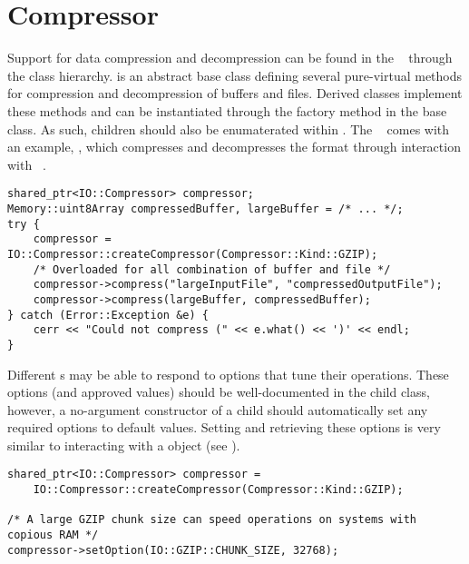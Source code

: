 \section{Compressor}
\label{sec-compressor}

Support for data compression and decompression can be found in the
\lname~ through the  class hierarchy.   is
an abstract base class defining several pure-virtual methods for compression
and decompression of buffers and files.  Derived classes implement these methods
and can be instantiated through the factory method in the base class.
As such, children should also be enumaterated within . 
The \lname~ comes with an example, , which compresses and
decompresses the  format through interaction with
~\cite{zlib}.

\begin{lstlisting}[caption={Using a \class{Compressor} Object}, label=lst:compressoruse]
shared_ptr<IO::Compressor> compressor;
Memory::uint8Array compressedBuffer, largeBuffer = /* ... */;
try {
	compressor = IO::Compressor::createCompressor(Compressor::Kind::GZIP);
	/* Overloaded for all combination of buffer and file */
	compressor->compress("largeInputFile", "compressedOutputFile");
	compressor->compress(largeBuffer, compressedBuffer);
} catch (Error::Exception &e) {
	cerr << "Could not compress (" << e.what() << ')' << endl;
}
\end{lstlisting}

Different s may be able to respond to options that tune their
operations.  These options (and approved values) should be well-documented
in the child class, however, a no-argument constructor of a child
 should automatically set any required options to default
values.  Setting and retrieving these options is very similar to interacting
with a  object (see ).

\begin{lstlisting}[caption={Setting \class{Compressor} Options}, label=lst:compressoroptions]
shared_ptr<IO::Compressor> compressor =
    IO::Compressor::createCompressor(Compressor::Kind::GZIP);

/* A large GZIP chunk size can speed operations on systems with copious RAM */
compressor->setOption(IO::GZIP::CHUNK_SIZE, 32768);

\end{lstlisting}
